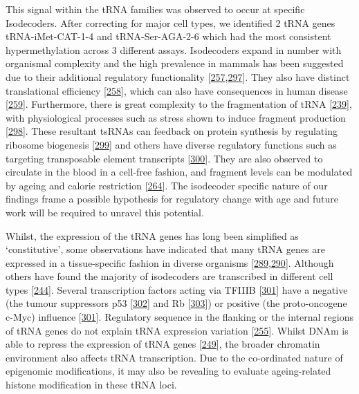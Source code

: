 \documentclass[
]{book}
\begin{document}
This signal within the tRNA families was observed to occur at specific Isodecoders.
After correcting for major cell types, we identified 2 tRNA genes tRNA-iMet-CAT-1-4 and tRNA-Ser-AGA-2-6 which had the most consistent hypermethylation across 3 different assays.
Isodecoders expand in number with organismal complexity and the high prevalence in mammals has been suggested due to their additional regulatory functionality {[}\protect\hyperlink{ref-Goodenbour2006}{257},\protect\hyperlink{ref-Keam2014}{297}{]}.
They also have distinct translational efficiency {[}\protect\hyperlink{ref-Geslain2010}{258}{]}, which can also have consequences in human disease {[}\protect\hyperlink{ref-Kirchner2017}{259}{]}.
Furthermore, there is great complexity to the fragmentation of tRNA {[}\protect\hyperlink{ref-Schimmel2017}{239}{]}, with physiological processes such as stress shown to induce fragment production {[}\protect\hyperlink{ref-Li2019}{298}{]}.
These resultant tsRNAs can feedback on protein synthesis by regulating ribosome biogenesis {[}\protect\hyperlink{ref-Kim2017}{299}{]} and others have diverse regulatory functions such as targeting transposable element transcripts {[}\protect\hyperlink{ref-Martinez2017}{300}{]}.
They are also observed to circulate in the blood in a cell-free fashion, and fragment levels can be modulated by ageing and calorie restriction {[}\protect\hyperlink{ref-Dhahbi2013}{264}{]}.
The isodecoder specific nature of our findings frame a possible hypothesis for regulatory change with age and future work will be required to unravel this potential.

Whilst, the expression of the tRNA genes has long been simplified as `constitutive', some observations have indicated that many tRNA genes are expressed in a tissue-specific fashion in diverse organisms {[}\protect\hyperlink{ref-Dittmar2006}{289},\protect\hyperlink{ref-Sagi2016}{290}{]}.
Although others have found the majority of isodecoders are transcribed in different cell types {[}\protect\hyperlink{ref-Parisien2013}{244}{]}.
Several transcription factors acting via TFIIIB {[}\protect\hyperlink{ref-Gomez-Roman2003}{301}{]} have a negative (the tumour suppressors p53 {[}\protect\hyperlink{ref-Crighton2003}{302}{]} and Rb {[}\protect\hyperlink{ref-Sutcliffe2000}{303}{]}) or positive (the proto-oncogene c-Myc) influence {[}\protect\hyperlink{ref-Gomez-Roman2003}{301}{]}.
Regulatory sequence in the flanking or the internal regions of tRNA genes do not explain tRNA expression variation {[}\protect\hyperlink{ref-Schmitt2014}{255}{]}.
Whilst DNAm is able to repress the expression of tRNA genes {[}\protect\hyperlink{ref-Besser1990}{249}{]}, the broader chromatin environment also affects tRNA transcription.
Due to the co-ordinated nature of epigenomic modifications, it may also be revealing to evaluate ageing-related histone modification in these tRNA loci.
\end{document}
